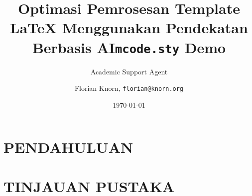 \documentclass{article}
\title{Optimasi Pemrosesan Template LaTeX Menggunakan Pendekatan Berbasis AI}
\author{Academic Support Agent}
\date{\today}
\begin{document}
\maketitle

\begin{abstract}

\end{abstract}

\chapter{PENDAHULUAN}


\chapter{TINJAUAN PUSTAKA}


%
%

\usepackage[framed,numbered,autolinebreaks,useliterate]{mcode}

\usepackage{url}
\setlength{\parindent}{0pt}
\setlength{\parskip}{18pt}
\title{\texttt{mcode.sty} Demo}
\author{Florian Knorn, \texttt{florian@knorn.org}}
\end{document}
